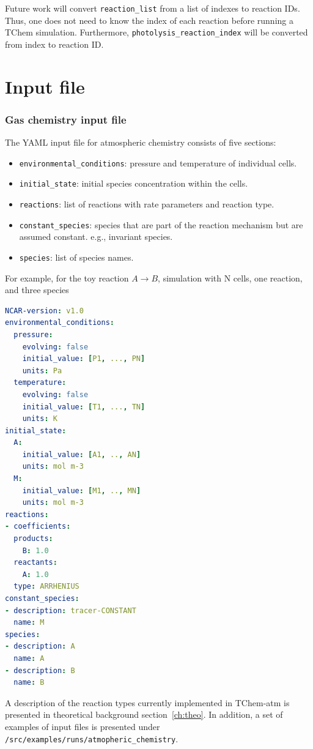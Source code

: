 \documentclass[report, 12pt]{SANDreport}
\begin{document}
Future work will convert \verb|reaction_list| from a list of indexes to reaction IDs. Thus, one does not need to know the index of each reaction before running a TChem simulation. Furthermore, \verb|photolysis_reaction_index| will be converted from index to reaction ID.

\chapter{Input file}

\subsection{Gas chemistry input file}

The YAML input file for atmospheric chemistry consists of five sections:

\begin{itemize}
\item \verb|environmental_conditions|: pressure and temperature of individual cells.
\item \verb|initial_state|: initial species concentration within the cells.
\item \verb|reactions|: list of reactions with rate parameters and reaction type.
\item \verb|constant_species|: species that are part of the reaction mechanism but are assumed constant.
e.g., invariant species.
\item \verb|species|: list of species names.
\end{itemize}

For example, for the toy reaction $A \rightarrow B$, simulation with N cells, one reaction, and three species


\begin{lstlisting}[language=yaml]
NCAR-version: v1.0
environmental_conditions:
  pressure:
    evolving: false
    initial_value: [P1, ..., PN]
    units: Pa
  temperature:
    evolving: false
    initial_value: [T1, ..., TN]
    units: K
initial_state:
  A:
    initial_value: [A1, .., AN]
    units: mol m-3
  M:
    initial_value: [M1, .., MN]
    units: mol m-3
reactions:
- coefficients:
  products:
    B: 1.0
  reactants:
    A: 1.0
  type: ARRHENIUS
constant_species:
- description: tracer-CONSTANT
  name: M
species:
- description: A
  name: A
- description: B
  name: B
\end{lstlisting}

A description of the reaction types currently implemented in TChem-atm is presented in theoretical background section~\ref{ch:theo}. In addition, a set of examples of input files is presented under \verb|/src/examples/runs/atmopheric_chemistry|.
\end{document}
